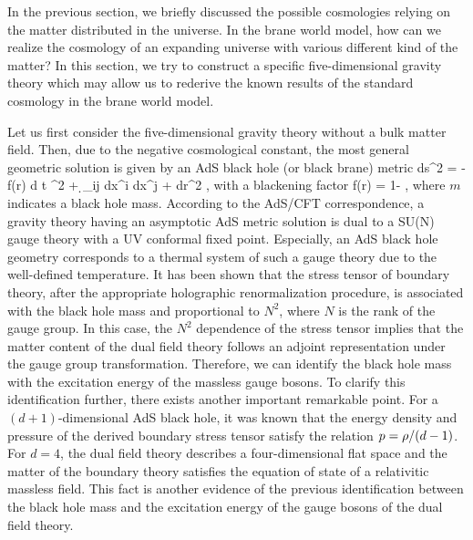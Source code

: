 \documentclass[12pt]{article}
\begin{document}
In the previous section, we briefly discussed the possible cosmologies relying on the matter distributed in the universe. In the brane world model, how can we realize the cosmology of an expanding universe with various different kind of the matter? In this section, we try to construct a specific five-dimensional  gravity theory which may allow us to rederive the known results of the standard cosmology in the brane world model.

Let us first consider the five-dimensional gravity theory without a bulk matter field. Then, due to the negative cosmological constant, the most general geometric solution is given by an AdS black hole (or black brane) metric
\be
ds^2 =   \ls -   f(r) d t ^2 +  \d_{ij} dx^i dx^j  \fr{}{} \rs   + dr^2 ,
\ee
with a blackening factor
\be		{}
f(r) = 1-   ,
\ee
where $m$ indicates a black hole mass. According to the AdS/CFT correspondence, a gravity theory having an asymptotic AdS metric solution is dual to a SU(N) gauge theory with a UV conformal fixed point. Especially, an AdS black hole geometry corresponds to a thermal system of such a gauge theory due to the well-defined temperature. It has been shown that the stress tensor of boundary theory, after the appropriate holographic renormalization procedure, is associated with the black hole mass and proportional to $N^2$, where $N$ is the rank of the gauge group. In this case, the $N^2$ dependence of the stress tensor implies that the matter content of the dual field theory follows an adjoint representation under the gauge group transformation. Therefore, we can identify the black hole mass with the excitation energy of the massless gauge bosons. To clarify this identification further, there exists another important remarkable point. For a $(d+1)$-dimensional AdS black hole,  it was known that the energy density and pressure of the derived boundary stress tensor satisfy the relation $p = \rho/(d-1)$. For $d=4$, the dual field theory describes a four-dimensional flat space and the matter of the boundary theory satisfies the equation of state of a relativitic massless field. This fact is another evidence of the previous identification between the black hole mass and the excitation energy of the gauge bosons of the dual field theory.   
\end{document}
